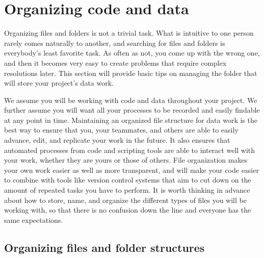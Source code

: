 \section{Organizing code and data}

Organizing files and folders is not a trivial task.
What is intuitive to one person rarely comes naturally to another,
and searching for files and folders is everybody's least favorite task.
As often as not, you come up with the wrong one,
and then it becomes very easy to create problems that require complex resolutions later.
This section will provide basic tips on managing the folder
that will store your project's data work.

We assume you will be working with code and data throughout your project.
We further assume you will want all your processes to be recorded
and easily findable at any point in time.
Maintaining an organized file structure for data work is the best way
to ensure that you, your teammates, and others
are able to easily advance, edit, and replicate your work in the future.
It also ensures that automated processes from code and scripting tools
are able to interact well with your work,
whether they are yours or those of others.
File organization makes your own work easier as well as more transparent,
and will make your code easier to combine with tools like version control systems
that aim to cut down on the amount of repeated tasks you have to perform.
It is worth thinking in advance about how to store, name, and organize
the different types of files you will be working with,
so that there is no confusion down the line
and everyone has the same expectations.

\subsection{Organizing files and folder structures}


